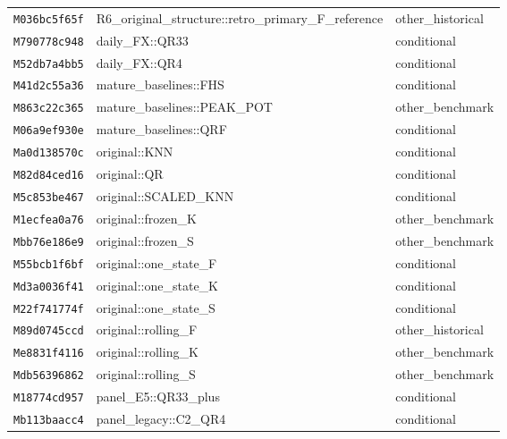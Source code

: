 \begin{longtable}{p{.19\linewidth}p{.58\linewidth}p{.15\linewidth}}
\texttt{M036bc5f65f} & R6\_\allowbreak{}original\_\allowbreak{}structure::\allowbreak{}retro\_\allowbreak{}primary\_\allowbreak{}F\_\allowbreak{}reference & other\_\allowbreak{}historical \\
\texttt{M790778c948} & daily\_\allowbreak{}FX::\allowbreak{}QR33 & conditional \\
\texttt{M52db7a4bb5} & daily\_\allowbreak{}FX::\allowbreak{}QR4 & conditional \\
\texttt{M41d2c55a36} & mature\_\allowbreak{}baselines::\allowbreak{}FHS & conditional \\
\texttt{M863c22c365} & mature\_\allowbreak{}baselines::\allowbreak{}PEAK\_\allowbreak{}POT & other\_\allowbreak{}benchmark \\
\texttt{M06a9ef930e} & mature\_\allowbreak{}baselines::\allowbreak{}QRF & conditional \\
\texttt{Ma0d138570c} & original::\allowbreak{}KNN & conditional \\
\texttt{M82d84ced16} & original::\allowbreak{}QR & conditional \\
\texttt{M5c853be467} & original::\allowbreak{}SCALED\_\allowbreak{}KNN & conditional \\
\texttt{M1ecfea0a76} & original::\allowbreak{}frozen\_\allowbreak{}K & other\_\allowbreak{}benchmark \\
\texttt{Mbb76e186e9} & original::\allowbreak{}frozen\_\allowbreak{}S & other\_\allowbreak{}benchmark \\
\texttt{M55bcb1f6bf} & original::\allowbreak{}one\_\allowbreak{}state\_\allowbreak{}F & conditional \\
\texttt{Md3a0036f41} & original::\allowbreak{}one\_\allowbreak{}state\_\allowbreak{}K & conditional \\
\texttt{M22f741774f} & original::\allowbreak{}one\_\allowbreak{}state\_\allowbreak{}S & conditional \\
\texttt{M89d0745ccd} & original::\allowbreak{}rolling\_\allowbreak{}F & other\_\allowbreak{}historical \\
\texttt{Me8831f4116} & original::\allowbreak{}rolling\_\allowbreak{}K & other\_\allowbreak{}benchmark \\
\texttt{Mdb56396862} & original::\allowbreak{}rolling\_\allowbreak{}S & other\_\allowbreak{}benchmark \\
\texttt{M18774cd957} & panel\_\allowbreak{}E5::\allowbreak{}QR33\_\allowbreak{}plus & conditional \\
\texttt{Mb113baacc4} & panel\_\allowbreak{}legacy::\allowbreak{}C2\_\allowbreak{}QR4 & conditional \\

\end{longtable}
